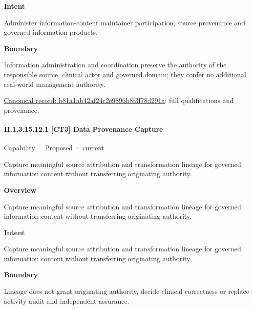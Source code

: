 \textbf{Intent}



Administer information-content maintainer participation, source provenance and governed information products.



\textbf{Boundary}



Information administration and coordination preserve the authority of the responsible source, clinical actor and governed domain; they confer no additional real-world management authority.


{\footnotesize \href{../../../../continuum/strategy/capability/b81a1ab42af24c2e9896b8f3f78d291a.md}{Canonical record: b81a1ab42af24c2e9896b8f3f78d291a}; full qualifications and provenance.}\par
\paragraph*{II.1.3.15.12.1 [CT3] Data Provenance Capture}
\label{navigation:II.1.3.15.12.1}

\label{element:44a7937520a54945b06b5fd4a2bbd870}
{\small Capability · Proposed · current}\par

Capture meaningful source attribution and transformation lineage for governed information content without transferring originating authority.



\textbf{Overview}



Capture meaningful source attribution and transformation lineage for governed information content without transferring originating authority.



\textbf{Intent}



Capture meaningful source attribution and transformation lineage for governed information content without transferring originating authority.



\textbf{Boundary}



Lineage does not grant originating authority, decide clinical correctness or replace activity audit and independent assurance.


